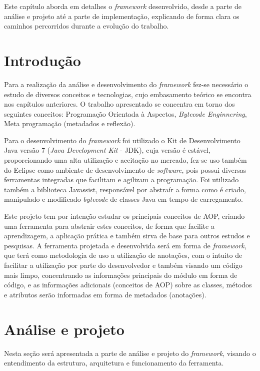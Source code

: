 \documentclass[tc,oneside]{iiufrgs}
\begin{document}
Este capítulo aborda em detalhes o \textit{framework} desenvolvido, desde a parte de análise  e projeto até a parte de implementação, explicando de forma clara os caminhos percorridos durante a evolução do trabalho.

\section{Introdução}

Para a realização da análise e desenvolvimento do \textit{framework} fez-se necessário o estudo de diversos conceitos e tecnologias,  cujo embasamento teórico se encontra nos capítulos anteriores. O trabalho apresentado se concentra em torno dos seguintes conceitos: Programação Orientada à Aspectos, \textit{Bytecode Enginnering}, Meta programação (metadados e reflexão).

Para o desenvolvimento do \textit{framework} foi utilizado o Kit de Desenvolvimento Java versão 7 (\textit{Java Development Kit} - JDK), cuja versão é estável, proporcionando uma alta utilização e aceitação no mercado, fez-se uso também do Eclipse como ambiente de desenvolvimento de \textit{software}, pois possui diversas ferramentas integradas que facilitam e agilizam a programação. Foi utilizado também a biblioteca Javassist, responsável por abstraír a forma como é criado, manipulado e modificado \textit{bytecode} de classes Java em tempo de carregamento. 

Este projeto tem por intenção estudar os principais conceitos de AOP,  criando uma ferramenta para abstrair estes conceitos, de forma que facilite a aprendizagem, a aplicação prática e também sirva de base para outros estudos e pesquisas. A ferramenta projetada e desenvolvida será em forma de \textit{framework}, que terá como metodologia de uso a utilização de anotações, com o intuito de facilitar a utilização por parte do desenvolvedor e também visando um código mais limpo, concentrando as informações principais do módulo em forma de código, e as informações adicionais (conceitos de AOP) sobre as classes, métodos e atributos serão informadas em forma de metadados (anotações).
\section{Análise e projeto}

Nesta seção será apresentada a parte de análise e projeto do \textit{framework}, visando o entendimento da estrutura, arquitetura e funcionamento da ferramenta.
\end{document}
